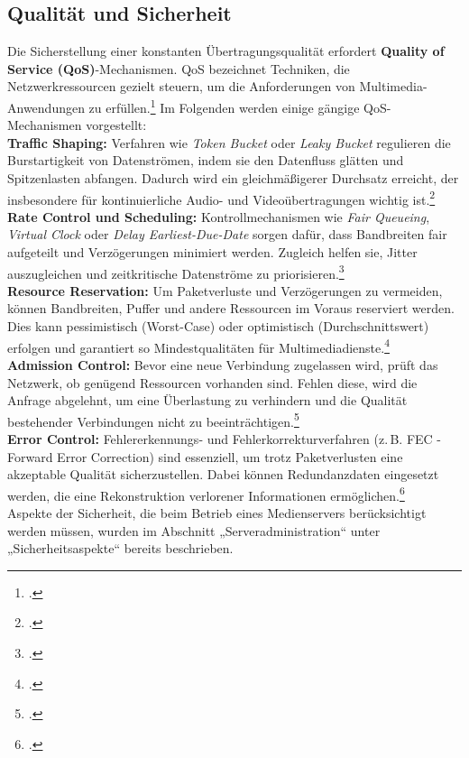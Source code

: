 \documentclass[12pt,a4paper]{report}
\begin{document}
  \subsection{Qualität und Sicherheit}  
  Die Sicherstellung einer konstanten Übertragungsqualität erfordert \textbf{Quality of Service (QoS)}-Mechanismen.  
  QoS bezeichnet Techniken, die Netzwerkressourcen gezielt steuern, um die Anforderungen von Multimedia-Anwendungen zu erfüllen.\footcite[Vgl.][S.~9~ff.]{steinmetz_multimedia}  
  Im Folgenden werden einige gängige QoS-Mechanismen vorgestellt: 
  \\
  \newline
  \textbf{Traffic Shaping:}  
  Verfahren wie \emph{Token Bucket} oder \emph{Leaky Bucket} regulieren die Burstartigkeit von Datenströmen, indem sie den Datenfluss glätten und Spitzenlasten abfangen.  
  Dadurch wird ein gleichmäßigerer Durchsatz erreicht, der insbesondere für kontinuierliche Audio- und Videoübertragungen wichtig ist.\footcite[Vgl.][S.~61~f.]{steinmetz_multimedia}  
  \\
  \newline
  \textbf{Rate Control und Scheduling:}  
  Kontrollmechanismen wie \emph{Fair Queueing}, \emph{Virtual Clock} oder \emph{Delay Earliest-Due-Date} sorgen dafür, 
  dass Bandbreiten fair aufgeteilt und Verzögerungen minimiert werden.  
  Zugleich helfen sie, Jitter auszugleichen und zeitkritische Datenströme zu priorisieren.\footcite[Vgl.][S.~62~f.]{steinmetz_multimedia}  
  \\
  \newline
  \textbf{Resource Reservation:}  
  Um Paketverluste und Verzögerungen zu vermeiden, können Bandbreiten, Puffer und andere Ressourcen im Voraus reserviert werden.  
  Dies kann pessimistisch (Worst-Case) oder optimistisch (Durchschnittswert) erfolgen und garantiert so Mindestqualitäten für Multimediadienste.\footcite[Vgl.][S.~52~f.]{steinmetz_multimedia}  
  \\
  \newline
  \textbf{Admission Control:}  
  Bevor eine neue Verbindung zugelassen wird, prüft das Netzwerk, ob genügend Ressourcen vorhanden sind.  
  Fehlen diese, wird die Anfrage abgelehnt, um eine Überlastung zu verhindern und die Qualität bestehender Verbindungen nicht zu beeinträchtigen.\footcite[Vgl.][S.~50~f.]{steinmetz_multimedia}  
  \\
  \newline
  \textbf{Error Control:}  
  Fehlererkennungs- und Fehlerkorrekturverfahren (z.\,B. FEC - Forward Error Correction) sind essenziell, 
  um trotz Paketverlusten eine akzeptable Qualität sicherzustellen.  
  Dabei können Redundanzdaten eingesetzt werden, die eine Rekonstruktion verlorener Informationen ermöglichen.\footcite[Vgl.][S.~68]{steinmetz_multimedia}  
  \\
  \newline  
  Aspekte der Sicherheit, die beim Betrieb eines Medienservers berücksichtigt werden müssen,
  wurden im Abschnitt „Serveradministration“ unter „Sicherheitsaspekte“ bereits beschrieben. 
    
\end{document}
